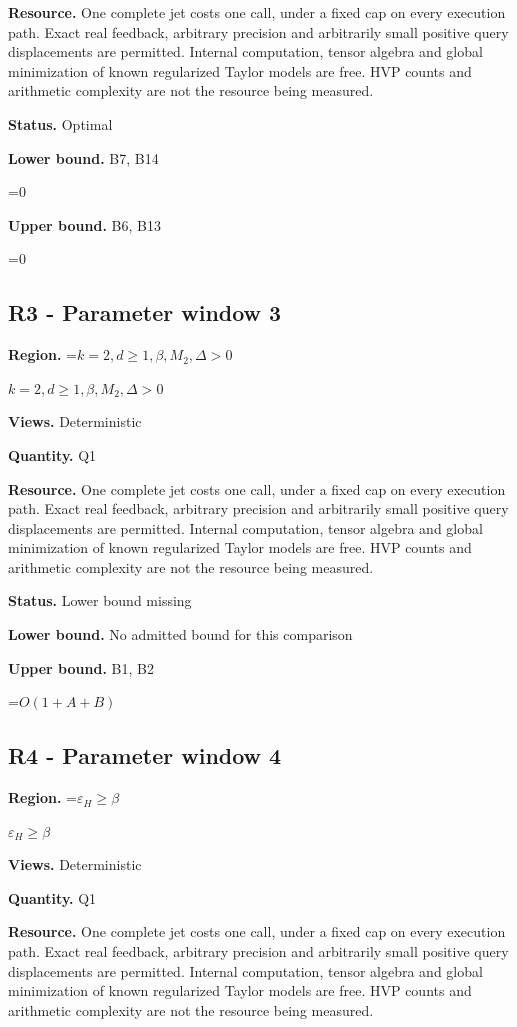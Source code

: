 \documentclass[10pt,a4paper]{article}
\newcommand{\AtlasMath}[1]{\par\begingroup\centering\setbox0=\hbox{$\displaystyle #1$}\ifdim\wd0>1.4\linewidth\typeout{ATLAS WIDE FORMULA: \the\wd0}\fi\ifdim\wd0>\linewidth\resizebox{\linewidth}{!}{\box0}\else\box0\fi\par\endgroup}
\newcommand{\AtlasInlineMath}[1]{\begingroup\setbox0=\hbox{$#1$}\ifdim\wd0>.4\linewidth\endgroup\AtlasMath{#1}\else\endgroup$#1$\fi}
\begin{document}
\textbf{Resource.} One complete jet costs one call, under a fixed cap on every execution path. Exact real feedback, arbitrary precision and arbitrarily small positive query displacements are permitted. Internal computation, tensor algebra and global minimization of known regularized Taylor models are free. HVP counts and arithmetic complexity are not the resource being measured.

\textbf{Status.} Optimal

\textbf{Lower bound.} B7, B14

\AtlasMath{0}
\textbf{Upper bound.} B6, B13

\AtlasMath{0}
\subsection{R3 - Parameter window 3}
\textbf{Region.} \AtlasInlineMath{k=2,d\ge 1,\beta,M_2,\Delta>0}

\textbf{Views.} Deterministic

\textbf{Quantity.} Q1

\textbf{Resource.} One complete jet costs one call, under a fixed cap on every execution path. Exact real feedback, arbitrary precision and arbitrarily small positive query displacements are permitted. Internal computation, tensor algebra and global minimization of known regularized Taylor models are free. HVP counts and arithmetic complexity are not the resource being measured.

\textbf{Status.} Lower bound missing

\textbf{Lower bound.} No admitted bound for this comparison

\textbf{Upper bound.} B1, B2

\AtlasMath{O(1+A+B)}
\subsection{R4 - Parameter window 4}
\textbf{Region.} \AtlasInlineMath{\varepsilon_H\ge \beta}

\textbf{Views.} Deterministic

\textbf{Quantity.} Q1

\textbf{Resource.} One complete jet costs one call, under a fixed cap on every execution path. Exact real feedback, arbitrary precision and arbitrarily small positive query displacements are permitted. Internal computation, tensor algebra and global minimization of known regularized Taylor models are free. HVP counts and arithmetic complexity are not the resource being measured.
\end{document}
